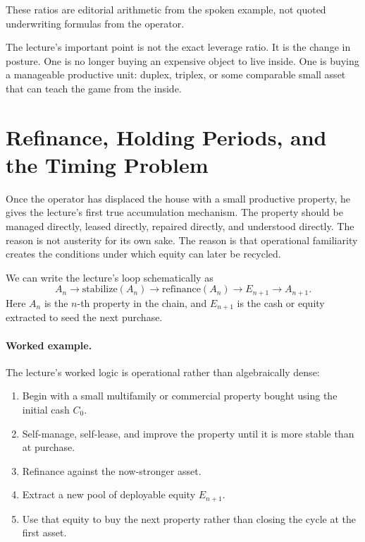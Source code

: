 \begin{remark}
These ratios are editorial arithmetic from the spoken example, not quoted underwriting formulas from the operator.
\end{remark}

The lecture's important point is not the exact leverage ratio. It is the change in posture. One is no longer buying an expensive object to live inside. One is buying a manageable productive unit: duplex, triplex, or some comparable small asset that can teach the game from the inside.

\section{Refinance, Holding Periods, and the Timing Problem}

Once the operator has displaced the house with a small productive property, he gives the lecture's first true accumulation mechanism. The property should be managed directly, leased directly, repaired directly, and understood directly. The reason is not austerity for its own sake. The reason is that operational familiarity creates the conditions under which equity can later be recycled.

We can write the lecture's loop schematically as
\begin{equation}
A_n \to \text{stabilize}(A_n) \to \text{refinance}(A_n) \to E_{n+1} \to A_{n+1}.
\end{equation}
Here \(A_n\) is the \(n\)-th property in the chain, and \(E_{n+1}\) is the cash or equity extracted to seed the next purchase.

\paragraph{Worked example.}
The lecture's worked logic is operational rather than algebraically dense:
\begin{enumerate}
\item Begin with a small multifamily or commercial property bought using the initial cash \(C_0\).
\item Self-manage, self-lease, and improve the property until it is more stable than at purchase.
\item Refinance against the now-stronger asset.
\item Extract a new pool of deployable equity \(E_{n+1}\).
\item Use that equity to buy the next property rather than closing the cycle at the first asset.
\end{enumerate}

